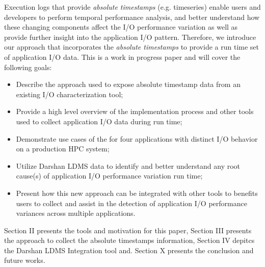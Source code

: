 
Execution logs that provide \emph{absolute timestamps}
(e.g. timeseries) enable users and developers to perform temporal
performance analysis, and better understand how these changing
components affect the I/O performance variation as well as provide
further insight into the application I/O pattern. Therefore, we
introduce our \Darshan approach that incorporates the \emph{absolute
  timestamps} to provide a run time set of application I/O data. This
is a work in progress paper and will cover the following goals:

\begin{itemize}
	\item Describe the approach used to expose absolute timestamp
          data from an existing I/O characterization tool;
       	\item Provide a high level overview of the implementation
          process and other tools used to collect application I/O data
          during run time;
       	\item Demonstrate use cases of the \connector for four
          applications with distinct I/O behavior on a production HPC
          system;
        \item Utilize Darshan LDMS data to identify and better
          understand any root cause(s) of application I/O performance
          variation run time;
	\item Present how this new approach can be integrated with
          other tools to benefits users to collect and assist in the
          detection of application I/O performance variances across
          multiple applications.
\end{itemize}

Section II presents the tools and motivation for this paper, Section
III presents the approach to collect the absolute timestamps
information, Section IV depitcs the Darshan LDMS Integration tool
and. Section X presents the conclusion and future works.

